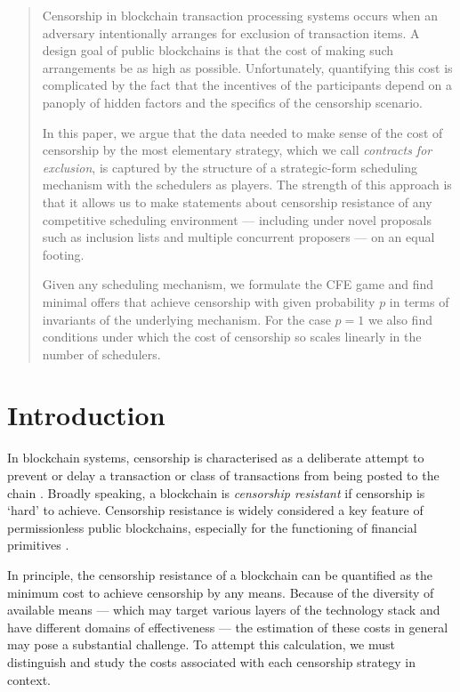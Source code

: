 \maketitle

\begin{abstract}

  Censorship in blockchain transaction processing systems occurs when an adversary intentionally arranges for exclusion of transaction items.
  A design goal of public blockchains is that the cost of making such arrangements be as high as possible.
  Unfortunately, quantifying this cost is complicated by the fact that the incentives of the participants depend on a panoply of hidden factors and the specifics of the censorship scenario.

  In this paper, we argue that the data needed to make sense of the cost of censorship by the most elementary strategy, which we call \emph{contracts for exclusion}, is captured by the structure of a strategic-form scheduling mechanism with the schedulers as players.
  The strength of this approach is that it allows us to make statements about censorship resistance of any competitive scheduling environment --- including under novel proposals such as inclusion lists and multiple concurrent proposers --- on an equal footing.

  Given any scheduling mechanism, we formulate the CFE game and find minimal offers that achieve censorship with given probability $p$ in terms of invariants of the underlying mechanism.
  For the case $p=1$ we also find conditions under which the cost of censorship so scales linearly in the number of schedulers.
  
\end{abstract}

\section{Introduction}

In blockchain systems, censorship is characterised as a deliberate attempt to prevent or delay a transaction or class of transactions from being posted to the chain \cite{wahrstatter2024blockchain}.
%
Broadly speaking, a blockchain is \emph{censorship resistant} if censorship is `hard' to achieve.
%
Censorship resistance is widely considered a key feature of permissionless public blockchains, especially for the functioning of financial primitives \cite{buterin2015problem}.

In principle, the censorship resistance of a blockchain can be quantified as the minimum cost to achieve censorship by any means.
%
Because of the diversity of available means --- which may target various layers of the technology stack and have different domains of effectiveness --- the estimation of these costs in general may pose a substantial challenge.
%
To attempt this calculation, we must distinguish and study the costs associated with each censorship strategy in context.

